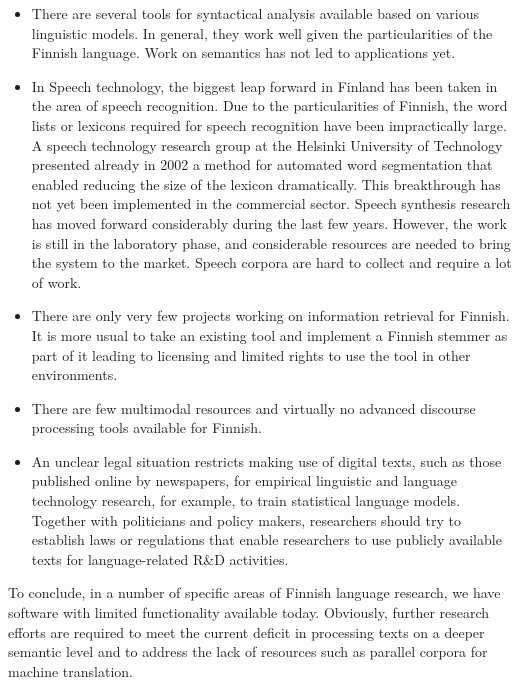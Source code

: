 \documentclass[]{../../metanetpaper}
\begin{document}
\begin{multicols}{2}
\begin{itemize}
\item There are several tools for syntactical analysis available based on various
    linguistic models. In general, they work well given the particularities of
    the Finnish language. Work on semantics has not led to applications yet.

\item In Speech technology, the biggest leap forward in Finland has been taken in
    the area of speech recognition. Due to the particularities of Finnish, the
    word lists or lexicons required for speech recognition have been
    impractically large. A speech technology research group at the Helsinki
    University of Technology presented already in 2002 a method for automated
    word segmentation that enabled reducing the size of the lexicon
    dramatically. This breakthrough has not yet been implemented in the
    commercial sector. Speech synthesis research has moved forward considerably
    during the last few years. However, the work is still in the laboratory
    phase, and considerable resources are needed to bring the system to the
    market. Speech corpora are hard to collect and require a lot of work.

\item There are only very few projects working on information retrieval for
    Finnish. It is more usual to take an existing tool and implement a Finnish
    stemmer as part of it leading to licensing and limited rights to use the
    tool in other environments.

\item There are few multimodal resources and virtually no advanced discourse
    processing tools available for Finnish.

\item An unclear legal situation restricts making use of digital texts, such as
    those published online by newspapers, for empirical linguistic and language
    technology research, for example, to train statistical language models.
    Together with politicians and policy makers, researchers should try to
    establish laws or regulations that enable researchers to use publicly
    available texts for language-related R\&D activities.
\end{itemize}

To conclude, in a number of specific areas of Finnish language research, we
have software with limited functionality available today. Obviously, further
research efforts are required to meet the current deficit in processing texts
on a deeper semantic level and to address the lack of resources such as
parallel corpora for machine translation.


\end{multicols}
\end{document}
